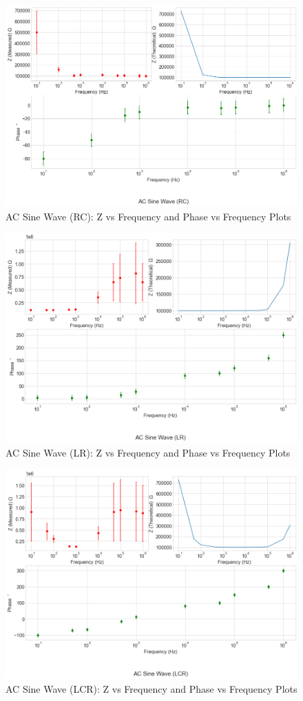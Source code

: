 \documentclass[a4paper,12pt]{article}
\begin{document}
\begin{figure}[H]
  \centering
  \includegraphics[width=0.8\linewidth]{../code/AC Sine Wave (RC).png}    
  \caption{AC Sine Wave (RC): Z vs Frequency and Phase vs Frequency Plots}
  \label{Combined_RC_AC}
\end{figure}

\begin{figure}[H]
  \centering
  \includegraphics[width=0.8\linewidth]{../code/AC Sine Wave (LR).png}    
    \caption{AC Sine Wave (LR): Z vs Frequency and Phase vs Frequency Plots}
    \label{Combined_LR_AC}
\end{figure}

\begin{figure}[H]
  \centering
  \includegraphics[width=0.8\linewidth]{../code/AC Sine Wave (LCR).png}    
    \caption{AC Sine Wave (LCR): Z vs Frequency and Phase vs Frequency Plots}
    \label{Combined_LCR_AC}
\end{figure}
\end{document}
